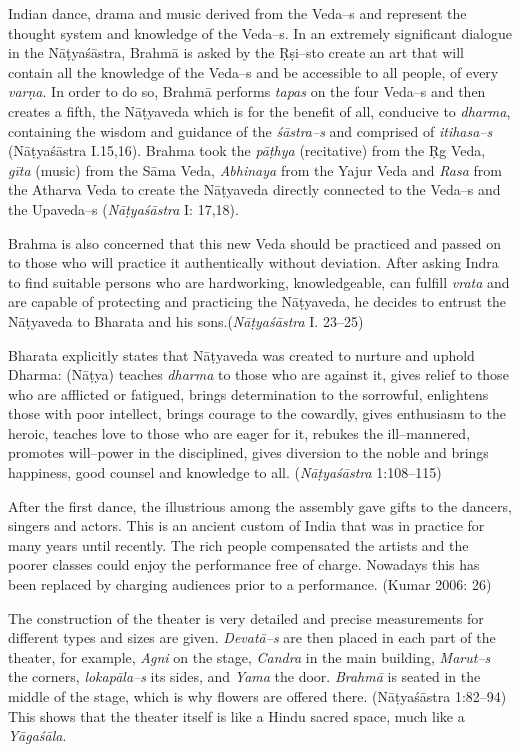 Indian dance, drama and music derived from the Veda–s and represent the thought system and knowledge of the Veda–s. In an extremely significant dialogue in the Nāṭyaśāstra, Brahmā is asked by the Ṛṣi–s\break to create an art that will contain all the knowledge of the Veda–s and be accessible to all people, of every \textit{varṇa}. In order to do so, Brahmā performs \textit{tapas} on the four Veda–s and then creates a fifth, the Nāṭyaveda which is for the benefit of all, conducive to \textit{dharma}, containing the wisdom and guidance of the \textit{śāstra–s }and comprised of \textit{itihasa–s} (Nāṭyaśāstra I.15,16). Brahma took the \textit{pāṭhya} (recitative) from the Ṛg Veda, \textit{gīta} (music) from the Sāma Veda, \textit{Abhinaya} from the Yajur Veda and \textit{Rasa} from the Atharva Veda to create the Nāṭyaveda directly connected to the Veda–s and the Upaveda–s (\textit{Nāṭyaśāstra} I: 17,18).

Brahma is also concerned that this new Veda should be practiced and passed on to those who will practice it authentically without deviation. After asking Indra to find suitable persons who are hardworking, knowledgeable, can fulfill \textit{vrata} and are capable of protecting and practicing the Nāṭyaveda, he decides to entrust the Nāṭyaveda to Bharata and his sons.(\textit{Nāṭyaśāstra} I. 23–25)

Bharata explicitly states that Nāṭyaveda was created to nurture and uphold Dharma: (Nāṭya) teaches \textit{dharma} to those who are against it, gives relief to those who are afflicted or fatigued, brings determination to the sorrowful, enlightens those with poor intellect, brings courage to the cowardly, gives enthusiasm to the heroic, teaches love to those who are eager for it, rebukes the ill–mannered, promotes will–power in the disciplined, gives diversion to the noble and brings happiness, good counsel and knowledge to all. (\textit{Nāṭyaśāstra} 1:108–115)

After the first dance, the illustrious among the assembly gave gifts to the dancers, singers and actors. This is an ancient custom of India that was in practice for many years until recently. The rich people compensated the artists and the poorer classes could enjoy the performance free of charge. Nowadays this has been replaced by charging audiences prior to a performance. (Kumar 2006: 26)

The construction of the theater is very detailed and precise measurements for different types and sizes are given. \textit{Devatā–s} are then placed in each part of the theater, for example, \textit{Agni} on the stage, \textit{Candra }in the main building, \textit{Marut–s} the corners, \textit{lokapāla–s} its sides, and \textit{Yama} the door. \textit{Brahmā} is seated in the middle of the stage, which is why flowers are offered there. (Nāṭyaśāstra 1:82–94) This shows that the theater itself is like a Hindu sacred space, much like a \textit{Yāgaśāla}.

